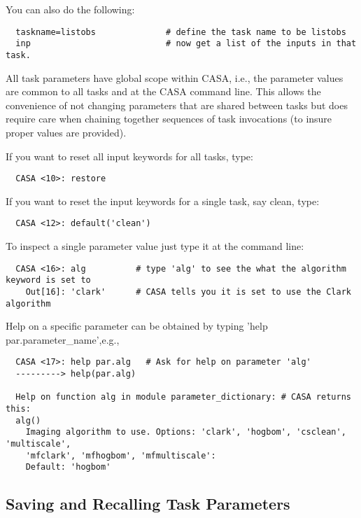 You can also do the following: 
\small
\begin{verbatim}
  taskname=listobs              # define the task name to be listobs
  inp                           # now get a list of the inputs in that task. 
\end{verbatim}
\normalsize


All task parameters have global scope within CASA, i.e., the
parameter values are common to all tasks and at the CASA command
line. This allows the convenience of not changing parameters that are
shared between tasks but does require care when chaining together
sequences of task invocations (to insure proper values are provided).

If you want to reset all input keywords for all tasks, type:

\small
\begin{verbatim}
  CASA <10>: restore
\end{verbatim}
\normalsize

If you want to reset the input keywords for a single task, say clean, type:

\small
\begin{verbatim}
  CASA <12>: default('clean')
\end{verbatim}
\normalsize

To inspect a single parameter value just type it at the command line:
\small
\begin{verbatim}
  CASA <16>: alg          # type 'alg' to see the what the algorithm keyword is set to
    Out[16]: 'clark'      # CASA tells you it is set to use the Clark algorithm
\end{verbatim}
\normalsize

Help on a specific parameter can be obtained by typing 'help par.parameter\_name',e.g.,

\small
\begin{verbatim}
  CASA <17>: help par.alg   # Ask for help on parameter 'alg'
  ---------> help(par.alg)

  Help on function alg in module parameter_dictionary: # CASA returns this: 
  alg()
    Imaging algorithm to use. Options: 'clark', 'hogbom', 'csclean', 'multiscale',
    'mfclark', 'mfhogbom', 'mfmultiscale':
    Default: 'hogbom'
\end{verbatim}
\normalsize


\subsection{Saving and Recalling Task Parameters}
\label{subsection:save.task.parms}

